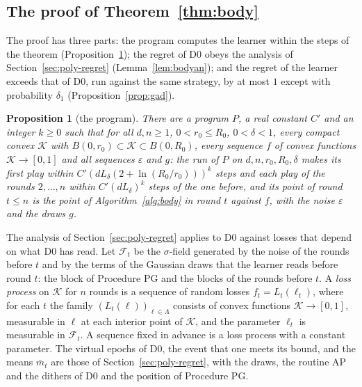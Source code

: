 \documentclass[11pt]{amsart}
\newtheorem{proposition}[theorem]{Proposition}
\theoremstyle{definition}
\numberwithin{equation}{section}
\newcommand{\cK}{\mathcal{K}}
\newcommand{\cF}{\mathscr{F}}
\begin{document}
\subsection{The proof of Theorem~\ref{thm:body}}\label{sec:body-proof}

The proof has three parts: the program computes the learner within the steps of the theorem (Proposition~\ref{prop:mach}); the regret of D0 obeys the analysis of Section~\ref{sec:poly-regret} (Lemma~\ref{lem:bodyan}); and the regret of the learner exceeds that of D0, run against the same strategy, by at most $1$ except with probability $\delta_1$ (Proposition~\ref{prop:gad}).

\begin{proposition}[the program]\label{prop:mach}
There are a program $P$, a real constant $C'$ and an integer $k\ge0$ such that for all $d,n\ge1$, $0<r_0\le R_0$, $0<\delta<1$, every compact convex $\cK$ with $B(0,r_0)\subset\cK\subset B(0,R_0)$, every sequence $f$ of convex functions $\cK\to[0,1]$ and all sequences $\varepsilon$ and $g$: the run of $P$ on $d,n,r_0,R_0,\delta$ makes its first play within $C'(dL_\delta(2+\ln(R_0/r_0)))^k$ steps and each play of the rounds $2,\dots,n$ within $C'(dL_\delta)^k$ steps of the one before, and its point of round $t\le n$ is the point of Algorithm~\ref{alg:body} in round $t$ against $f$, with the noise $\varepsilon$ and the draws $g$.
\end{proposition}

The analysis of Section~\ref{sec:poly-regret} applies to D0 against losses that depend on what D0 has read. Let $\cF_t$ be the $\sigma$-field generated by the noise of the rounds before $t$ and by the terms of the Gaussian draws that the learner reads before round $t$: the block of Procedure PG and the blocks of the rounds before $t$. A \emph{loss process} on $\cK$ for $n$ rounds is a sequence of random losses $f_t=L_t(\ell_t)$, where for each $t$ the family $(L_t(\ell))_{\ell\in\Lambda}$ consists of convex functions $\cK\to[0,1]$, measurable in $\ell$ at each interior point of $\cK$, and the parameter $\ell_t$ is measurable in $\cF_t$. A sequence fixed in advance is a loss process with a constant parameter. The virtual epochs of D0, the event that one meets its bound, and the means $\bar m_t$ are those of Section~\ref{sec:poly-regret}, with the draws, the routine AP and the dithers of D0 and the position of Procedure PG.
\end{document}
